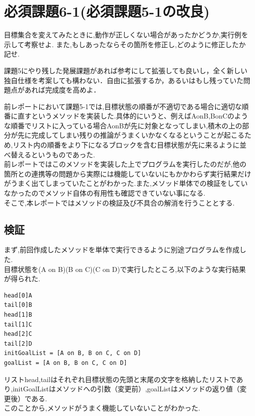 \documentclass[12pt]{jarticle}
\begin{document}
\section{必須課題6-1(必須課題5-1の改良)}
\begin{screen}
目標集合を変えてみたときに,動作が正しくない場合があったかどうか,実行例を示して考察せよ.
また,もしあったならその箇所を修正し,どのように修正したか記せ.
\end{screen}
\begin{screen}
課題5にやり残した発展課題があれば参考にして拡張しても良いし，全く新しい独自仕様を考案しても構わない．自由に拡張するか，あるいはもし残っていた問題点があれば完成度を高めよ．
\end{screen}
前レポートにおいて課題5-1では,目標状態の順番が不適切である場合に適切な順番に直すというメソッドを実装した.具体的にいうと、例えばAonB,BonCのような順番でリストに入っている場合AonBが先に対象となってしまい,積木の上の部分が先に完成してしまい残りの推論がうまくいかなくなるということが起こるため,リスト内の順番をより下になるブロックを含む目標状態が先に来るように並べ替えるというものであった.\\
前レポートではこのメソッドを実装した上でプログラムを実行したのだが,他の箇所との連携等の問題から実際には機能していないにもかかわらず実行結果だけがうまく出てしまっていたことがわかった.また,メソッド単体での検証をしていなかったのでメソッド自体の有用性も確認できていない事になる.\\
そこで,本レポートではメソッドの検証及び不具合の解消を行うこととする.

\subsection{検証}
まず,前回作成したメソッドを単体で実行できるように別途プログラムを作成した.\\
目標状態を(A on B)(B on C)(C on D)で実行したところ,以下のような実行結果が得られた.

\begin{lstlisting}[caption=修正前プログラム, label=mid]
head[0]A
tail[0]B
head[1]B
tail[1]C
head[2]C
tail[2]D
initGoalList = [A on B, B on C, C on D]
goalList = [A on B, B on C, C on D]
\end{lstlisting}
リストhead,tailはそれぞれ目標状態の先頭と末尾の文字を格納したリストであり,initGoalListはメソッドへの引数（変更前）,goalListはメソッドの返り値（変更後）である.\\
このことから,メソッドがうまく機能していないことがわかった.
\end{document}
